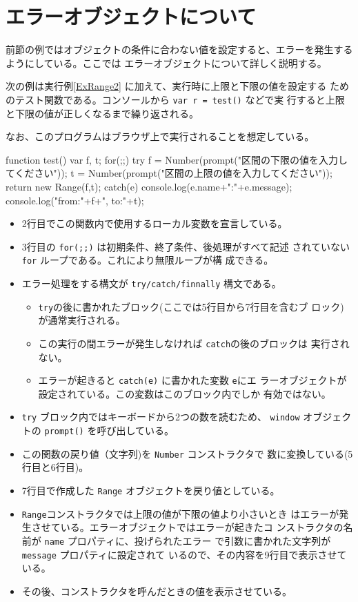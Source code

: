 \section{エラーオブジェクトについて}
前節の例ではオブジェクトの条件に合わない値を設定すると、エラーを発生する
ようにしている。ここでは エラーオブジェクトについて詳しく説明する。
\begin{Exec}\upshape
次の例は実行例\ref{ExRange2} に加えて、実行時に上限と下限の値を設定する
 ためのテスト関数である。コンソールから \texttt{var r = test()} などで実
 行すると上限と下限の値が正しくなるまで繰り返される。

なお、このプログラムはブラウザ上で実行されることを想定している。
\begin{listing}{1}
function test() {
  var f, t;
  for(;;) {
    try {
      f = Number(prompt("区間の下限の値を入力してください"));
      t = Number(prompt("区間の上限の値を入力してください"));
      return new Range(f,t);
    } catch(e) {
      console.log(e.name+":"+e.message);
      console.log("from:"+f+", to:"+t);
    }
  }
}
\end{listing}
\begin{itemize}
 \item 2行目でこの関数内で使用するローカル変数を宣言している。
 \item 3行目の \texttt{for(;;)} は初期条件、終了条件、後処理がすべて記述
       されていない \texttt{for} ループである。これにより無限ループが構
       成できる。
 \item エラー処理をする構文が \texttt{try/catch/finnally} 構文である。
\begin{itemize}
 \item \texttt{try}の後に書かれたブロック(ここでは5行目から7行目を含むブ
       ロック)が通常実行される。
 \item この実行の間エラーが発生しなければ \texttt{catch}の後のブロックは
       実行されない。
 \item エラーが起きると \texttt{catch(e)} に書かれた変数 \texttt{e}にエ
       ラーオブジェクトが設定されている。この変数はこのブロック内でしか
       有効ではない。
\end{itemize}
 \item \texttt{try} ブロック内ではキーボードから2つの数を読むため、
       \texttt{window} オブジェクトの \texttt{prompt()} を呼び出している。
 \item この関数の戻り値（文字列)を \texttt{Number} コンストラクタで
       数に変換している(5行目と6行目)。
 \item 7行目で作成した \texttt{Range} オブジェクトを戻り値としている。
 \item \texttt{Range}コンストラクタでは上限の値が下限の値より小さいとき
       はエラーが発生させている。エラーオブジェクトではエラーが起きたコ
       ンストラクタの名前が \texttt{name} プロパティに、投げられたエラー
       で引数に書かれた文字列が \texttt{message} プロパティに設定されて
       いるので、その内容を9行目で表示させている。
 \item その後、コンストラクタを呼んだときの値を表示させている。
\end{itemize}
\end{Exec}
